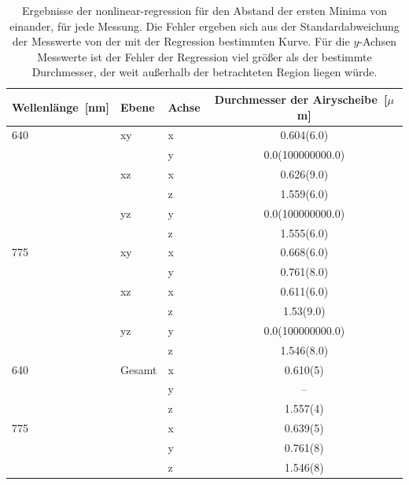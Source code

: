 \begin{table}
	\centering
	\caption{Ergebnisse der nonlinear-regression für den Abstand der ersten Minima von einander, für jede Messung.
	Die Fehler ergeben sich aus der Standardabweichung der Messwerte von der mit der Regression bestimmten Kurve.
Für die $y$-Achsen Messwerte ist der Fehler der Regression viel größer als der bestimmte Durchmesser, der weit außerhalb der betrachteten Region liegen würde. }
	\begin{tabular}{l|l|l|c}
		Wellenlänge~[nm] & Ebene & Achse & Durchmesser der Airyscheibe~[$\mu$m] \\ \hline 
		640 & xy & x  &  0.604(6.0)\\ 
		 &  & y  &  0.0(100000000.0)\\ 
		 & xz & x  &  0.626(9.0)\\ 
		 &  & z  &  1.559(6.0)\\ 
		 & yz & y  &  0.0(100000000.0)\\ 
		 &  & z  &  1.555(6.0)\\ 
		775 & xy & x  &  0.668(6.0)\\ 
		 &  & y  &  0.761(8.0)\\ 
		 & xz & x  &  0.611(6.0)\\ 
		 &  & z  &  1.53(9.0)\\ 
		 & yz & y  &  0.0(100000000.0)\\ 
		 &  & z  &  1.546(8.0)\\ \hline
		640 &Gesamt & x & 0.610(5)\\
		    &	&y& --\\ 
		    &	&z& 1.557(4)\\
		775 &	&x& 0.639(5)\\
		    &	&y& 0.761(8)\\
		    &	&z& 1.546(8)\\
	\end{tabular}

\end{table}

